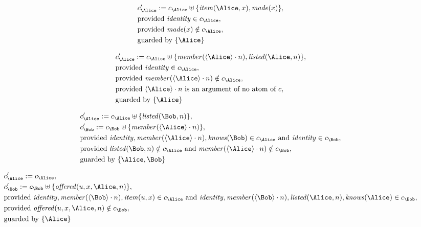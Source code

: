 \begin{align*}
&
c'_
{
\Alice
}
 := 
c_
{
\Alice
}
 \uplus 
\{
\mathit{
item
}
(
\Alice
,
x
)
,
\mathit{
made
}
(
x
)
\}
,\\
&
\text{provided } 
\mathit{
identity
}
 \in c_
{
\Alice
}
,\\
&
\text{provided } 
\mathit{
made
}
(
x
)
 \notin c_
{
\Alice
}
,\\
&
\text{guarded by } \{
\Alice
\}
\end{align*}

\begin{align*}
&
c'_
{
\Alice
}
 := 
c_
{
\Alice
}
 \uplus 
\{
\mathit{
member
}
(
\langle
\Alice
\rangle
\cdot
n
)
,
\mathit{
listed
}
(
\Alice
,
n
)
\}
,\\
&
\text{provided } 
\mathit{
identity
}
 \in c_
{
\Alice
}
,\\
&
\text{provided } 
\mathit{
member
}
(
\langle
\Alice
\rangle
\cdot
n
)
 \notin c_
{
\Alice
}
,\\
&
\text{provided } 
\langle
\Alice
\rangle
\cdot
n
 \text{ is an argument of no atom of } c
,\\
&
\text{guarded by } \{
\Alice
\}
\end{align*}

\begin{align*}
&
c'_
{
\Alice
}
 := 
c_
{
\Alice
}
 \uplus 
\{
\mathit{
listed
}
(
\Bob
,
n
)
\}
,\\
&
c'_
{
\Bob
}
 := 
c_
{
\Bob
}
 \uplus 
\{
\mathit{
member
}
(
\langle
\Alice
\rangle
\cdot
n
)
\}
,\\
&
\text{provided } 
\mathit{
identity
}
,
\mathit{
member
}
(
\langle
\Alice
\rangle
\cdot
n
)
,
\mathit{
knows
}
(
\Bob
)
 \in c_
{
\Alice
}
 \text{ and } 
\mathit{
identity
}
 \in c_
{
\Bob
}
,\\
&
\text{provided } 
\mathit{
listed
}
(
\Bob
,
n
)
 \notin c_
{
\Alice
}
 \text{ and } 
\mathit{
member
}
(
\langle
\Alice
\rangle
\cdot
n
)
 \notin c_
{
\Bob
}
,\\
&
\text{guarded by } \{
\Alice
,
\Bob
\}
\end{align*}

\begin{align*}
&
c'_
{
\Alice
}
 := 
c_
{
\Alice
}
,\\
&
c'_
{
\Bob
}
 := 
c_
{
\Bob
}
 \uplus 
\{
\mathit{
offered
}
(
u
,
x
,
\Alice
,
n
)
\}
,\\
&
\text{provided } 
\mathit{
identity
}
,
\mathit{
member
}
(
\langle
\Bob
\rangle
\cdot
n
)
,
\mathit{
item
}
(
u
,
x
)
 \in c_
{
\Alice
}
 \text{ and } 
\mathit{
identity
}
,
\mathit{
member
}
(
\langle
\Bob
\rangle
\cdot
n
)
,
\mathit{
listed
}
(
\Alice
,
n
)
,
\mathit{
knows
}
(
\Alice
)
 \in c_
{
\Bob
}
,\\
&
\text{provided } 
\mathit{
offered
}
(
u
,
x
,
\Alice
,
n
)
 \notin c_
{
\Bob
}
,\\
&
\text{guarded by } \{
\Alice
\}
\end{align*}
